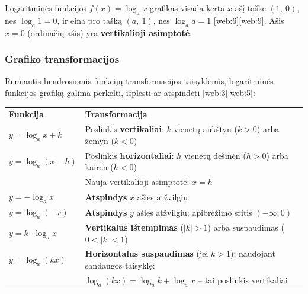 Logaritminės funkcijos $f(x) = \log_a x$ grafikas visada kerta $x$ ašį taške $(1,\ 0)$, nes $\log_a 1 = 0$, ir eina pro tašką $(a,\ 1)$, nes $\log_a a = 1$ [web:6][web:9]. Ašis $x = 0$ (ordinačių ašis) yra \textbf{vertikalioji asimptotė}.

\begin{center}
\end{center}

\subsubsection*{Grafiko transformacijos}

Remiantis bendrosiomis funkcijų transformacijos taisyklėmis, logaritminės funkcijos grafiką galima perkelti, išplėsti ar atspindėti [web:3][web:5]:

\begin{tcolorbox}[title={Transformacijų lentelė}]
\begin{tabular}{ll}
\textbf{Funkcija} & \textbf{Transformacija} \\[4pt]
$y = \log_a x + k$ & Poslinkis \textbf{vertikaliai}: $k$ vienetų aukštyn ($k>0$) arba žemyn ($k<0$) \\[4pt]
$y = \log_a(x - h)$ & Poslinkis \textbf{horizontaliai}: $h$ vienetų dešinėn ($h>0$) arba kairėn ($h<0$) \\
& Nauja vertikalioji asimptotė: $x = h$ \\[4pt]
$y = -\log_a x$ & \textbf{Atspindys} $x$ ašies atžvilgiu \\[4pt]
$y = \log_a(-x)$ & \textbf{Atspindys} $y$ ašies atžvilgiu; apibrėžimo sritis $(-\infty; 0)$ \\[4pt]
$y = k \cdot \log_a x$ & \textbf{Vertikalus ištempimas} ($|k|>1$) arba suspaudimas ($0<|k|<1$) \\[4pt]
$y = \log_a(kx)$ & \textbf{Horizontalus suspaudimas} (jei $k>1$); naudojant sandaugos taisyklę: \\
& $\log_a(kx) = \log_a k + \log_a x$ – tai poslinkis vertikaliai \\
\end{tabular}
\end{tcolorbox}

